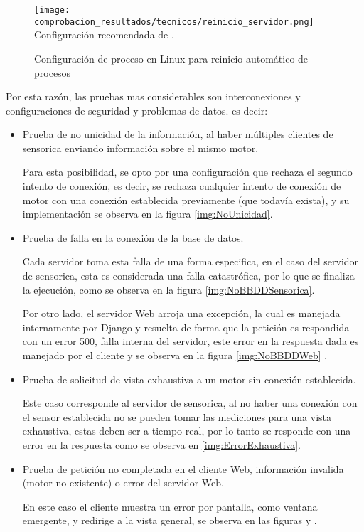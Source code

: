 	\begin{figure}[htb]
		\centering
        \caption{Configuración de proceso en Linux para reinicio automático de procesos}
        \texttt{[image: comprobacion\_resultados/tecnicos/reinicio\_servidor.png]}
        Configuración recomendada de \Cite{ConfiguracionProcesos}.
        \label{img:ProcesosLinux}
	\end{figure}

Por esta razón, las pruebas mas considerables son interconexiones y configuraciones
de seguridad y problemas de datos. es decir:

\begin{itemize}
    \item Prueba de no unicidad de la información, al haber múltiples
        clientes de sensorica enviando información sobre el mismo motor.

        Para esta posibilidad, se opto por una configuración que rechaza el
        segundo intento de conexión, es decir, se rechaza cualquier intento de
        conexión de motor con una conexión establecida previamente (que todavía
        exista), y su implementación se observa en la figura \ref{img:NoUnicidad}.
%
    \item Prueba de falla en la conexión de la base de datos.

        Cada servidor toma esta falla de una forma especifica, en el caso del
        servidor de sensorica, esta es considerada una falla catastrófica, por
        lo que se finaliza la ejecución, como se observa en la figura
        \ref{img:NoBBDDSensorica}.

        Por otro lado, el servidor Web arroja una excepción, la cual es manejada
        internamente por Django y resuelta de forma que la petición es respondida
        con un error 500, falla interna del servidor, este error en la respuesta
        dada es manejado por el cliente y se observa en la figura
        \ref{img:NoBBDDWeb} .
%
    \item Prueba de solicitud de vista exhaustiva a un motor sin conexión
        establecida.

        Este caso corresponde al servidor de sensorica, al no haber una conexión
        con el sensor establecida no se pueden tomar las mediciones para una vista
        exhaustiva, estas deben ser a tiempo real, por lo tanto se responde
        con una error en la respuesta como se observa en \ref{img:ErrorExhaustiva}.
%
    \item Prueba de petición no completada en el cliente Web,
        información invalida (motor no existente) o error del servidor Web.

        En este caso el cliente muestra un error por pantalla, como ventana
        emergente, y redirige a la vista general, se observa en las figuras y  .
\end{itemize}


